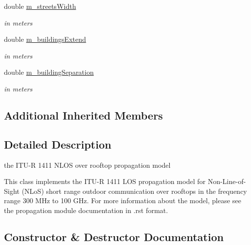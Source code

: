\begin{DoxyCompactItemize}
double \hyperlink{classns3_1_1ItuR1411NlosOverRooftopPropagationLossModel_a7d7efdcbb1640cfa92fb2503722b5981}{m\+\_\+streets\+Width}
\begin{DoxyCompactList}\small\item\em in meters \end{DoxyCompactList}\item 
double \hyperlink{classns3_1_1ItuR1411NlosOverRooftopPropagationLossModel_a4149a57bc530ce41fa79a6df4a6c97bb}{m\+\_\+buildings\+Extend}
\begin{DoxyCompactList}\small\item\em in meters \end{DoxyCompactList}\item 
double \hyperlink{classns3_1_1ItuR1411NlosOverRooftopPropagationLossModel_a0a5d582dab436582f150f731abc30623}{m\+\_\+building\+Separation}
\begin{DoxyCompactList}\small\item\em in meters \end{DoxyCompactList}\end{DoxyCompactItemize}
\subsection*{Additional Inherited Members}


\subsection{Detailed Description}
the I\+T\+U-\/R 1411 N\+L\+OS over rooftop propagation model 

This class implements the I\+T\+U-\/R 1411 L\+OS propagation model for Non-\/\+Line-\/of-\/\+Sight (N\+LoS) short range outdoor communication over rooftops in the frequency range 300 M\+Hz to 100 G\+Hz. For more information about the model, please see the propagation module documentation in .rst format. 

\subsection{Constructor \& Destructor Documentation}
